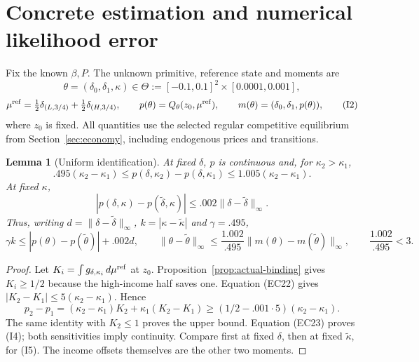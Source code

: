 \documentclass[11pt,a4paper]{article}
\newtheorem{lemma}[theorem]{Lemma}
\begin{document}
\section{Concrete estimation and numerical likelihood error}
\label{sec:inference}
Fix the known $\beta,P$. The unknown primitive, reference state and moments are
\[
 \theta=(\delta_0,\delta_1,\kappa)\in\Theta
 :=[-0.1,0.1]^2\times[0.0001,0.001],                         \tag{I1}
\]
\[
 \mu^{\rm ref}=\tfrac12\delta_{(L,3/4)}+\tfrac12\delta_{(H,3/4)},\qquad
 p(\theta)=Q_\theta(z_0,\mu^{\rm ref}),\qquad
 m(\theta)=(\delta_0,\delta_1,p(\theta)),                     \tag{I2}
\]
where $z_0$ is fixed. All quantities use the selected regular competitive
equilibrium from Section~\ref{sec:economy}, including endogenous prices and transitions.
\begin{lemma}[Uniform identification]\label{lem:price-identification}
At fixed $\delta$, $p$ is continuous and, for $\kappa_2>\kappa_1$,
\[
 .495(\kappa_2-\kappa_1)\leq p(\delta,\kappa_2)-p(\delta,\kappa_1)
 \leq1.005(\kappa_2-\kappa_1).                              \tag{I3}
\]
At fixed $\kappa$,
\[
 |p(\delta,\kappa)-p(\widetilde\delta,\kappa)|
 \leq.002\|\delta-\widetilde\delta\|_\infty.                  \tag{I4}
\]
Thus, writing $d=\|\delta-\widetilde\delta\|_\infty$,
$k=|\kappa-\widetilde\kappa|$ and $\gamma=.495$,
\[
 \gamma k\leq|p(\theta)-p(\widetilde\theta)|+.002d,\qquad
 \|\theta-\widetilde\theta\|_\infty
 \leq\frac{1.002}{.495}\|m(\theta)-m(\widetilde\theta)\|_\infty,
 \qquad\frac{1.002}{.495}<3.                                \tag{I5}
\]
\end{lemma}
\begin{proof}
Let $K_i=\int g_{\delta,\kappa_i}\,d\mu^{\rm ref}$ at $z_0$.
Proposition~\ref{prop:actual-binding} gives $K_i\geq1/2$ because the
high-income half saves one. Equation \textup{(EC22)} gives
$|K_2-K_1|\leq5(\kappa_2-\kappa_1)$. Hence
\[
 p_2-p_1=(\kappa_2-\kappa_1)K_2+\kappa_1(K_2-K_1)
 \geq(1/2-.001\cdot5)(\kappa_2-\kappa_1).
\]
The same identity with $K_2\leq1$ proves the upper bound. Equation
\textup{(EC23)} proves \textup{(I4)}; both sensitivities imply continuity.
Compare first at fixed $\delta$, then at fixed $\widetilde\kappa$, for
\textup{(I5)}. The income offsets themselves are the other two moments.
\end{proof}
\end{document}
